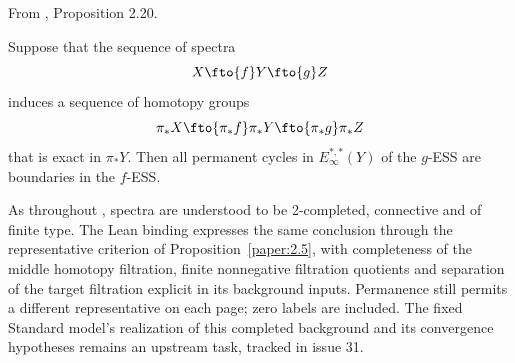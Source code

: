 \begin{proposition}
\label{paper:2.20}
From \cite{LWX126}, Proposition 2.20.\par
\label{prop:cfe810af}
    Suppose that the sequence of spectra
    $$X\fto{f}Y\fto{g}Z$$
    induces a sequence of homotopy groups
    $$\pi_*X\fto{\pi_*f}\pi_*Y\fto{\pi_*g}\pi_*Z$$
    that is exact in $\pi_*Y$. Then all permanent cycles in $E^{*,*}_\infty(Y)$ of the $g$-ESS are boundaries in the $f$-ESS.



As throughout \cite{LWX126}, spectra are understood to be 2-completed,
connective and of finite type. The Lean binding expresses the same
conclusion through the representative criterion of
Proposition~\ref{paper:2.5}, with completeness of the middle homotopy
filtration, finite nonnegative filtration quotients and separation of the
target filtration explicit in its background inputs. Permanence still
permits a different representative on each page; zero labels are included.
The fixed Standard model's realization of this completed background and
its convergence hypotheses remains an upstream task, tracked in
issue 31.
\end{proposition}
